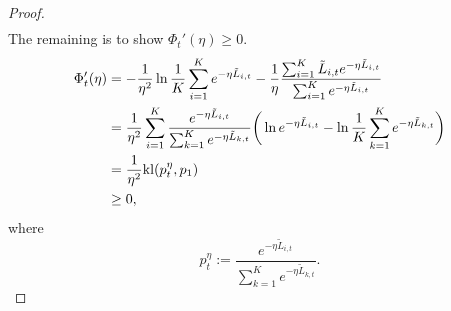 \begin{proof}
\begin{align}
    \end{align}
    The remaining is to show $\Phi_t'(\eta)\ge0$.
    \begin{align}
        \Phi_t'(\eta)
            &= -\frac{1}{\eta^2}\ln\frac{1}{K} \sum_{i=1}^K e^{-\eta\tilde L_{i,t}}
                - \frac{1}{\eta}\frac{\sum_{i=1}^K \tilde L_{i,t}e^{-\eta\tilde L_{i,t}}}{\sum_{i=1}^K e^{-\eta\tilde L_{i,t}}} \\
            &= \frac{1}{\eta^2}\sum_{i=1}^K \frac{e^{-\eta\tilde L_{i,t}}}{\sum_{k=1}^K e^{-\eta\tilde L_{k,t}}}\bigg(
                \ln e^{- \eta \tilde L_{i,t}} - \ln\frac{1}{K} \sum_{k=1}^K e^{-\eta\tilde L_{k,t}}\bigg) \\
            &= \frac{1}{\eta^2}{\mathop{\mathrm{kl}}}(p_t^\eta, p_1) \\
            &\ge 0,
    \end{align}
    where
    \begin{equation}
        p_t^\eta:=\frac{e^{-\eta\tilde L_{i,t}}}{\sum_{k=1}^K e^{-\eta\tilde L_{k,t}}}.
    \end{equation}
\end{proof}
